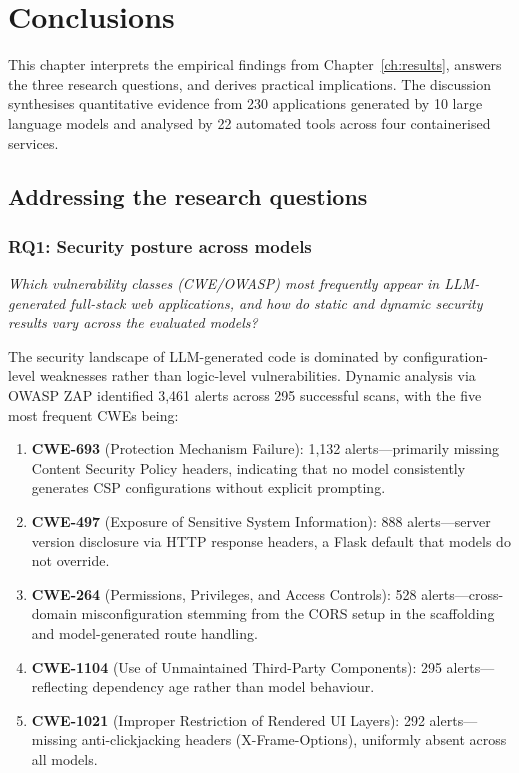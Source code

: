 \chapter{Conclusions}
\label{ch:implications}

This chapter interprets the empirical findings from Chapter~\ref{ch:results}, answers the three research questions, and derives practical implications. The discussion synthesises quantitative evidence from 230 applications generated by 10 large language models and analysed by 22 automated tools across four containerised services.

\section{Addressing the research questions}
\label{sec:research_questions}

\subsection{RQ1: Security posture across models}

\textit{Which vulnerability classes (CWE/OWASP) most frequently appear in LLM-generated full-stack web applications, and how do static and dynamic security results vary across the evaluated models?}

The security landscape of LLM-generated code is dominated by configuration-level weaknesses rather than logic-level vulnerabilities. Dynamic analysis via OWASP ZAP identified 3{,}461 alerts across 295 successful scans, with the five most frequent CWEs being:

\begin{enumerate}
    \item \textbf{CWE-693} (Protection Mechanism Failure): 1{,}132 alerts---primarily missing Content Security Policy headers, indicating that no model consistently generates CSP configurations without explicit prompting.
    \item \textbf{CWE-497} (Exposure of Sensitive System Information): 888 alerts---server version disclosure via HTTP response headers, a Flask default that models do not override.
    \item \textbf{CWE-264} (Permissions, Privileges, and Access Controls): 528 alerts---cross-domain misconfiguration stemming from the CORS setup in the scaffolding and model-generated route handling.
    \item \textbf{CWE-1104} (Use of Unmaintained Third-Party Components): 295 alerts---reflecting dependency age rather than model behaviour.
    \item \textbf{CWE-1021} (Improper Restriction of Rendered UI Layers): 292 alerts---missing anti-clickjacking headers (X-Frame-Options), uniformly absent across all models.
\end{enumerate}


